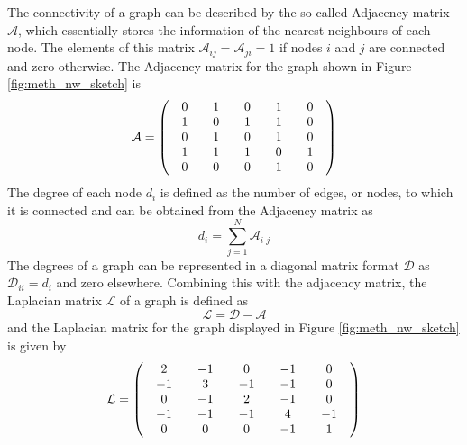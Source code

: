 The connectivity of a graph can be described by the so-called Adjacency matrix $\mathcal{A}$, which essentially stores the information of the nearest neighbours of each node. The elements of this matrix $\mathcal{A}_{\textit{ij}} = \mathcal{A}_{\textit{ji}} = 1$ if nodes $\textit{i}$ and $\textit{j}$ are connected and zero otherwise. The Adjacency matrix for the graph shown in Figure \ref{fig:meth_nw_sketch} is 
\begin{equation}
\setlength\arraycolsep{10pt}
\mathcal{A} = 
\left( \begin{array}{c c c c c}
0 & 1 & 0 & 1 & 0 \\
1 & 0 & 1 & 1 & 0 \\
0 & 1 & 0 & 1 & 0\\
1 & 1 & 1 & 0 & 1\\
0 & 0 & 0 & 1 & 0
\end{array} \right)
\label{eq: o_adjacency_matrix}
\end{equation}
The degree of each node $d_\textit{i}$ is defined as the number of edges, or nodes, to which it is connected and can be obtained from the Adjacency matrix as 
\begin{equation}
d_\textit{i} = \sum_{\textit{j} = 1}^{N} \mathcal{A}_{\textit{i j}}
\end{equation}
The degrees of a graph can be represented in a diagonal matrix format $\mathcal{D}$ as $\mathcal{D}_{\textit{ii}} = d_{i}$ and zero elsewhere. Combining this with the adjacency matrix, the Laplacian matrix $\mathcal{L}$ of a graph is defined as
\begin{equation}
\mathcal{L} = \mathcal{D} - \mathcal{A}
\end{equation}
and the Laplacian matrix for the graph displayed in Figure \ref{fig:meth_nw_sketch} is given by
\begin{equation}
\setlength\arraycolsep{10pt}
\mathcal{L} = 
\left( \begin{array}{ccccc}
2 & -1 & 0 & -1 & 0 \\
-1 & 3 & -1 & -1 & 0 \\
0 & -1 & 2 & -1 & 0\\
-1 & -1 & -1 & 4 & -1\\
0 & 0 & 0 & -1 & 1
\end{array} \right)
\label{eq: laplace_matrix}
\end{equation}

